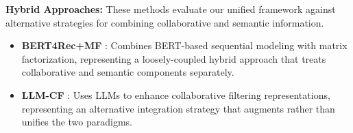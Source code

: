 \documentclass[acmsmall]{acmart}
\begin{document}
\textbf{Hybrid Approaches:}
These methods evaluate our unified framework against alternative strategies for combining collaborative and semantic information.

\begin{itemize}
\item \textbf{BERT4Rec+MF} \cite{sun2021bert4rec}: Combines BERT-based sequential modeling with matrix factorization, representing a loosely-coupled hybrid approach that treats collaborative and semantic components separately.
\item \textbf{LLM-CF} \cite{wu2024llm}: Uses LLMs to enhance collaborative filtering representations, representing an alternative integration strategy that augments rather than unifies the two paradigms.
\end{itemize}




\end{document}
